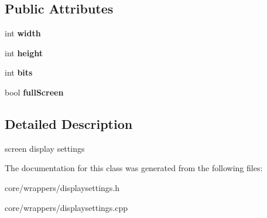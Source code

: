 \subsection*{Public Attributes}
\begin{DoxyCompactItemize}
\item 
\hypertarget{class_tempest_1_1_display_settings_ac38b409a76cff6ac40baf6d819394ea3}{int {\bfseries width}}\label{class_tempest_1_1_display_settings_ac38b409a76cff6ac40baf6d819394ea3}

\item 
\hypertarget{class_tempest_1_1_display_settings_a341b61dc93be2ace7fbe1f3e9128af8b}{int {\bfseries height}}\label{class_tempest_1_1_display_settings_a341b61dc93be2ace7fbe1f3e9128af8b}

\item 
\hypertarget{class_tempest_1_1_display_settings_a6cb61a6265507aa912899bcdadd87820}{int {\bfseries bits}}\label{class_tempest_1_1_display_settings_a6cb61a6265507aa912899bcdadd87820}

\item 
\hypertarget{class_tempest_1_1_display_settings_a39a25d5c50c105d1b07bf37679960698}{bool {\bfseries full\+Screen}}\label{class_tempest_1_1_display_settings_a39a25d5c50c105d1b07bf37679960698}

\end{DoxyCompactItemize}


\subsection{Detailed Description}
screen display settings 

The documentation for this class was generated from the following files\+:\begin{DoxyCompactItemize}
\item 
core/wrappers/displaysettings.\+h\item 
core/wrappers/displaysettings.\+cpp\end{DoxyCompactItemize}
